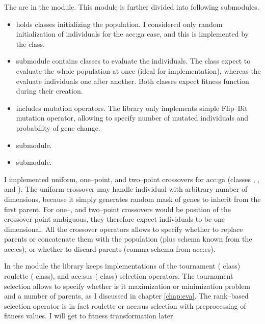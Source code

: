 The  are in the  module. This module is further divided into following submodules.
\begin{itemize}
    \item {} holds classes initializing the population. I considered only random initialization of individuals for the \acrshort{acc:ga} case, and this is implemented by the  class.
    \item {} submodule contains classes to evaluate the individuals. The  class expect to evaluate the whole population at once (ideal for \gpu implementation), whereas the  evaluate individuals one after another. Both classes expect fitness function during their creation.
    \item {} includes mutation operators. The library only implements simple Flip--Bit mutation operator, allowing to specify number of mutated individuals and probability of gene change.
    \item {} submodule.
    \item {} submodule.
\end{itemize}

I implemented uniform, one--point, and two--point crossovers for \acrshort{acc:ga} (classes , , and ). The uniform crossover may handle individual with arbitrary number of dimensions, because it simply generates random mask of genes to inherit from the first parent. For one--, and two--point crossovers would be position of the crossover point ambiguous, they therefore expect individuals to be one--dimensional.
All the crossover operators allows to specify whether to replace parents or concatenate them with the population (plus schema known from the \acrshort{acc:es}), or whether to discard parents (comma schema from \acrshort{acc:es}).

In the  module the library keeps implementations of the 
tournament ( class)
roulette ( class), 
and \acrlong{acc:sus} ( class)
selection operators. The tournament selection allows to specify whether is it maximization or minimization problem and a number of parents, as I discussed in chapter \ref{chap:eva}. The rank--based selection operator is in fact roulette or \acrshort{acc:sus} selection with preprocessing of fitness values. I will get to fitness transformation later.

